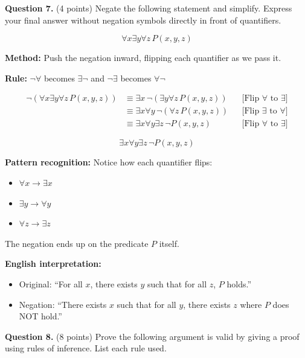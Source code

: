 \documentclass[11pt,a4paper]{article}
\begin{document}
\vspace{15pt}

\textbf{Question 7.} (4 points) Negate the following statement and simplify. Express your final answer without negation symbols directly in front of quantifiers.

$$\forall x \exists y \forall z\, P(x, y, z)$$

\begin{solnbox}
\textbf{Method:} Push the negation inward, flipping each quantifier as we pass it.

\textbf{Rule:} $\neg \forall$ becomes $\exists \neg$ and $\neg \exists$ becomes $\forall \neg$

\begin{align*}
\neg(\forall x \exists y \forall z\, P(x, y, z)) &\equiv \exists x\, \neg(\exists y \forall z\, P(x, y, z)) && \text{[Flip } \forall \text{ to } \exists \text{]} \\
&\equiv \exists x \forall y\, \neg(\forall z\, P(x, y, z)) && \text{[Flip } \exists \text{ to } \forall \text{]} \\
&\equiv \exists x \forall y \exists z\, \neg P(x, y, z) && \text{[Flip } \forall \text{ to } \exists \text{]}
\end{align*}

$$\boxed{\exists x \forall y \exists z\, \neg P(x, y, z)}$$

\textbf{Pattern recognition:} Notice how each quantifier flips:
\begin{itemize}[noitemsep]
    \item $\forall x \to \exists x$
    \item $\exists y \to \forall y$  
    \item $\forall z \to \exists z$
\end{itemize}

The negation ends up on the predicate $P$ itself.

\textbf{English interpretation:} 
\begin{itemize}[noitemsep]
    \item Original: ``For all $x$, there exists $y$ such that for all $z$, $P$ holds.''
    \item Negation: ``There exists $x$ such that for all $y$, there exists $z$ where $P$ does NOT hold.''
\end{itemize}
\end{solnbox}

\vspace{15pt}

\textbf{Question 8.} (8 points) Prove the following argument is valid by giving a proof using rules of inference. List each rule used.
\end{document}

